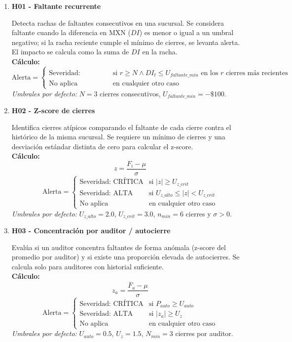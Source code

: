 \documentclass[11pt]{article}
\begin{document}
\begin{enumerate}
  \item \textbf{H01 - Faltante recurrente}

        Detecta rachas de faltantes consecutivos en una sucursal. Se considera faltante cuando la diferencia en MXN ($DI$) es menor o igual a un umbral negativo; si la racha reciente cumple el mínimo de cierres, se levanta alerta. El impacto se calcula como la suma de $DI$ en la racha.
        \\
        \textbf{Cálculo:}
        \[
        \text{Alerta} = \begin{cases}
        \text{Severidad: CRÍTICA} & \text{si } r \ge N \land DI_t \le U_{faltante\_min} \text{ en los } r \text{ cierres más recientes} \\
        \text{No aplica} & \text{en cualquier otro caso}
        \end{cases}
        \]
        \textit{Umbrales por defecto:} $N=3$ cierres consecutivos, $U_{faltante\_min} = -\$100$.

  \item \textbf{H02 - Z-score de cierres}

        Identifica cierres atípicos comparando el faltante de cada cierre contra el histórico de la misma sucursal. Se requiere un mínimo de cierres y una desviación estándar distinta de cero para calcular el z-score.
        \\
        \textbf{Cálculo:}
        \[
        z = \frac{F_i - \mu}{\sigma}
        \]
        \[
        \text{Alerta} = \begin{cases}
        \text{Severidad: CRÍTICA} & \text{si } |z| \ge U_{z\_crit} \\
        \text{Severidad: ALTA} & \text{si } U_{z\_alto} \le |z| < U_{z\_crit} \\
        \text{No aplica} & \text{en cualquier otro caso}
        \end{cases}
        \]
        \textit{Umbrales por defecto:} $U_{z\_alto}=2.0$, $U_{z\_crit}=3.0$, $n_{min}=6$ cierres y $\sigma > 0$.

  \item \textbf{H03 - Concentración por auditor / autocierre}

        Evalúa si un auditor concentra faltantes de forma anómala (z-score del promedio por auditor) y si existe una proporción elevada de autocierres. Se calcula solo para auditores con historial suficiente.
        \\
        \textbf{Cálculo:}
        \[
        z_a = \frac{\overline{F}_a - \mu}{\sigma}
        \]
        \[
        \text{Alerta} = \begin{cases}
        \text{Severidad: CRÍTICA} & \text{si } P_{auto} \ge U_{auto} \\
        \text{Severidad: ALTA} & \text{si } |z_a| \ge U_{z} \\
        \text{No aplica} & \text{en cualquier otro caso}
        \end{cases}
        \]
        \textit{Umbrales por defecto:} $U_{auto}=0.5$, $U_{z}=1.5$, $N_{min}=3$ cierres por auditor.
\end{enumerate}
\end{document}
